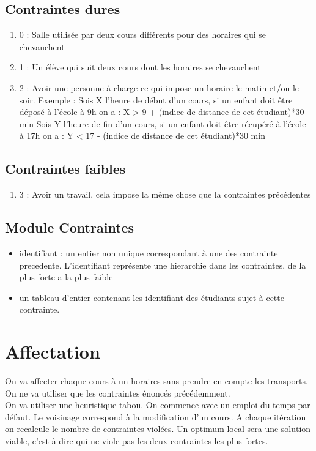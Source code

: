 \documentclass[a4paper,11pt]{article}
\begin{document}
	\subsection{Contraintes dures}
		\begin{enumerate}
			\item 0 : Salle utilisée par deux cours différents pour des horaires 
			qui se chevauchent
			\item 1 : Un élève qui suit deux cours dont les horaires se chevauchent
			\item 2 : Avoir une personne à charge ce qui impose un horaire le matin et/ou le soir.
			Exemple : Sois X l'heure de début d'un cours, si un enfant doit être déposé à l'école à 9h on a : X > 9 + (indice de distance de cet étudiant)*30 min
			Sois Y l'heure de fin d'un cours, si un enfant doit être récupéré à l'école à 17h on a : Y < 17 - (indice de distance de cet étudiant)*30 min			
		\end{enumerate}
	\subsection{Contraintes faibles}
		\begin{enumerate}
			\item 3 : Avoir un travail, cela impose la même chose que la contraintes précédentes
		\end{enumerate}
	\subsection{Module Contraintes}                                                           		\begin{itemize}
			\item identifiant : un entier non unique correspondant à une des contrainte precedente. L'identifiant représente une hierarchie dans les contraintes, de la plus forte a la plus faible 
			\item un tableau d'entier contenant les identifiant des étudiants sujet à cette contrainte.
		\end{itemize}
\section{Affectation}
	On va affecter chaque cours à un horaires sans prendre en compte les transports. On ne va utiliser que les contraintes énoncés précédemment. \\
	On va utiliser une heuristique tabou. On commence avec un emploi du temps par défaut. Le voisinage correspond à la modification d'un cours. A chaque itération on recalcule le nombre de contraintes violées. Un optimum local sera une solution viable, c'est à dire qui ne viole pas les deux contraintes les plus fortes. 
	
\end{document}
